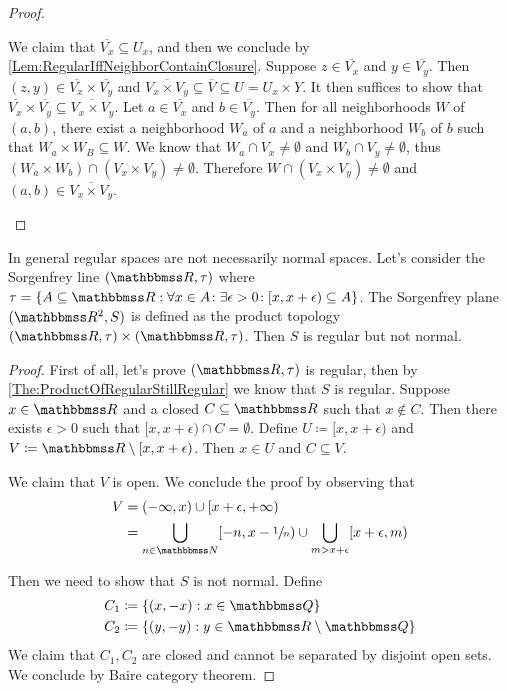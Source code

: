 \documentclass[screen,single]{techreport}
\numberwithin{equation}{section}
\begin{document}
\begin{proof}
\begin{itemize}
		We claim that $\overline{V_x} \subseteq U_x$, and then we conclude by \cref{Lem:RegularIffNeighborContainClosure}.
		Suppose $z \in \overline{V_x}$ and $y \in \overline{V_y}$.
		Then $(z,y) \in \overline{V_x} \times \overline{V_y}$ and $\overline{V_x \times V_y} \subseteq \overline{V} \subseteq U = U_x \times Y$.
		It then suffices to show that $\overline{V_x} \times \overline{V_y} \subseteq \overline{V_x \times V_y}$.
		Let $a \in \overline{V_x}$ and $b \in \overline{V_y}$.
		Then for all neighborhoods $W$ of $(a,b)$, there exist a neighborhood $W_a$ of $a$ and a neighborhood $W_b$ of $b$ such that $W_a \times W_B \subseteq W$.
		We know that $W_a \cap V_x \neq \emptyset$ and $W_b \cap V_y \neq \emptyset$,
		thus $(W_a \times W_b) \cap (V_x \times V_y) \neq \emptyset$.
		Therefore $W \cap (V_x \times V_y) \neq \emptyset$ and $(a,b) \in \overline{V_x\times V_y}$.
	\end{itemize}
\end{proof}

\begin{example}\label{Exa:RegularNotImplyNormal}
	In general regular spaces are not necessarily normal spaces.
	Let's consider the Sorgenfrey line $(\bbR,\tau)$ where $\tau = \{ A \subseteq \bbR : \Forall{x \in A} \Exists{\epsilon > 0} [x,x+\epsilon) \subseteq A \}$.
	The Sorgenfrey plane $(\bbR^2,S)$ is defined as the product topology $(\bbR,\tau) \times (\bbR,\tau)$.
	Then $S$ is regular but not normal.
\end{example}
\begin{proof}
	First of all, let's prove $(\bbR,\tau)$ is regular, then by \cref{The:ProductOfRegularStillRegular} we know that $S$ is regular.
	Suppose $x \in \bbR$ and a closed $C \subseteq \bbR$ such that $x \not\in C$.
	Then there exists $\epsilon>0$ such that $[x,x+\epsilon) \cap C = \emptyset$.
	Define $U \coloneqq [x,x+\epsilon)$ and $V \coloneqq \bbR \setminus [x,x+\epsilon)$.
	Then $x \in U$ and $C \subseteq V$.
	
	We claim that $V$ is open. We conclude the proof by observing that
	\begin{align*}
		V & = (-\infty,x) \cup [x+\epsilon,+\infty) \\
		& = \bigcup_{n \in \bbN} [-n, x-\sfrac{1}{n}) \cup \bigcup_{m > x + \epsilon} [x+\epsilon,m)
	\end{align*}
	
	Then we need to show that $S$ is not normal.
	Define
	\begin{align*}
		C_1 & \coloneqq \{ (x,-x) : x \in \bbQ \} \\
		C_2 & \coloneqq \{ (y,-y) : y \in \bbR \setminus \bbQ \}
	\end{align*}
	We claim that $C_1,C_2$ are closed and cannot be separated by disjoint open sets.
	We conclude by {\color{Red}Baire category theorem}.
\end{proof}
\end{document}
